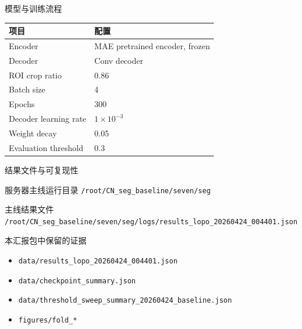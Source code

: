 \documentclass[
  presentation,
  titlegraphic=./images/bit_logo.pdf,
  framelogo=./images/bit_logo.pdf
]{bitbeamer}
\begin{document}
\begin{frame}[t]{模型与训练流程}
  \centering

  \vspace{0.6cm}

  \begin{table}
    \centering
    \small
    \begin{tabular}{ll}
      \toprule
      项目 & 配置 \\
      \midrule
      Encoder & MAE pretrained encoder, frozen \\
      Decoder & Conv decoder \\
      ROI crop ratio & 0.86 \\
      Batch size & 4 \\
      Epochs & 300 \\
      Decoder learning rate & $1\times10^{-3}$ \\
      Weight decay & 0.05 \\
      Evaluation threshold & 0.3 \\
      \bottomrule
    \end{tabular}
  \end{table}
\end{frame}

\begin{frame}[t]{结果文件与可复现性}
  \begin{block}{服务器主线运行目录}
    \texttt{/root/CN\_seg\_baseline/seven/seg}
  \end{block}

  \begin{block}{主线结果文件}
    \texttt{/root/CN\_seg\_baseline/seven/seg/logs/results\_lopo\_20260424\_004401.json}
  \end{block}

  \begin{block}{本汇报包中保留的证据}
    \begin{itemize}
      \item \texttt{data/results\_lopo\_20260424\_004401.json}
      \item \texttt{data/checkpoint\_summary.json}
      \item \texttt{data/threshold\_sweep\_summary\_20260424\_baseline.json}
      \item \texttt{figures/fold\_*}
    \end{itemize}
  \end{block}
\end{frame}
\end{document}
